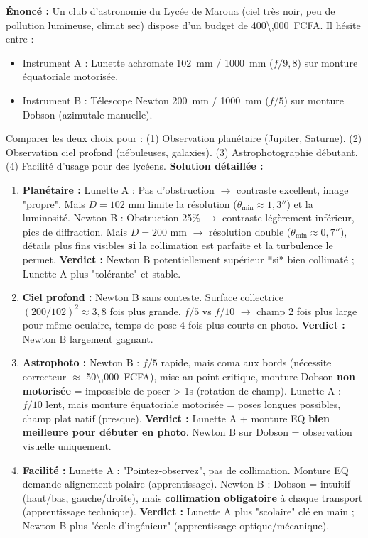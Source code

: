 \documentclass[11pt]{article}
\begin{document}
\begin{exoresolu}
\textbf{Énoncé :} Un club d'astronomie du Lycée de Maroua (ciel très noir, peu de pollution lumineuse, climat sec) dispose d'un budget de \SI{400\,000}{FCFA}. Il hésite entre :
\begin{itemize}
    \item Instrument A : Lunette achromate \SI{102}{mm} / \SI{1000}{mm} ($f/9,8$) sur monture équatoriale motorisée.
    \item Instrument B : Télescope Newton \SI{200}{mm} / \SI{1000}{mm} ($f/5$) sur monture Dobson (azimutale manuelle).
\end{itemize}
Comparer les deux choix pour : (1) Observation planétaire (Jupiter, Saturne). (2) Observation ciel profond (nébuleuses, galaxies). (3) Astrophotographie débutant. (4) Facilité d'usage pour des lycéens.
\textbf{Solution détaillée :}
\begin{enumerate}
    \item \textbf{Planétaire :} Lunette A : Pas d'obstruction $\to$ contraste excellent, image "propre". Mais $D=102$ mm limite la résolution ($\theta_{\text{min}} \approx 1,3''$) et la luminosité. Newton B : Obstruction 25\% $\to$ contraste légèrement inférieur, pics de diffraction. Mais $D=200$ mm $\to$ résolution double ($\theta_{\text{min}} \approx 0,7''$), détails plus fins visibles \textbf{si} la collimation est parfaite et la turbulence le permet. \textbf{Verdict :} Newton B potentiellement supérieur *si* bien collimaté ; Lunette A plus "tolérante" et stable.
    \item \textbf{Ciel profond :} Newton B sans conteste. Surface collectrice $(200/102)^2 \approx 3,8$ fois plus grande. $f/5$ vs $f/10$ $\to$ champ 2 fois plus large pour même oculaire, temps de pose 4 fois plus courts en photo. \textbf{Verdict :} Newton B largement gagnant.
    \item \textbf{Astrophoto :} Newton B : $f/5$ rapide, mais coma aux bords (nécessite correcteur $\approx$ \SI{50\,000}{FCFA}), mise au point critique, monture Dobson \textbf{non motorisée} = impossible de poser > 1s (rotation de champ). Lunette A : $f/10$ lent, mais monture équatoriale motorisée = poses longues possibles, champ plat natif (presque). \textbf{Verdict :} Lunette A + monture EQ \textbf{bien meilleure pour débuter en photo}. Newton B sur Dobson = observation visuelle uniquement.
    \item \textbf{Facilité :} Lunette A : "Pointez-observez", pas de collimation. Monture EQ demande alignement polaire (apprentissage). Newton B : Dobson = intuitif (haut/bas, gauche/droite), mais \textbf{collimation obligatoire} à chaque transport (apprentissage technique). \textbf{Verdict :} Lunette A plus "scolaire" clé en main ; Newton B plus "école d'ingénieur" (apprentissage optique/mécanique).

\end{enumerate}
\end{exoresolu}
\end{document}
